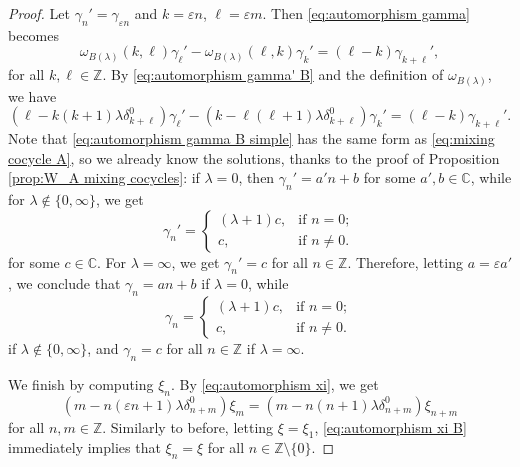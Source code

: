 \documentclass[11pt, svgnames]{amsart}
\newcommand{\ZZ}{\mathbb{Z}}
\newcommand{\CC}{\mathbb{C}}
\newcommand{\nonzero}{\setminus \{0\}}
\theoremstyle{definition}
\begin{document}
\begin{proof}
    Let $\gamma_n' = \gamma_{\varepsilon n}$ and $k = \varepsilon n$, $\ell = \varepsilon m$. Then \eqref{eq:automorphism gamma} becomes
    \begin{equation}\label{eq:automorphism gamma' B}
        \omega_{B(\lambda)}(k,\ell)\gamma_\ell' - \omega_{B(\lambda)}(\ell,k)\gamma_k' = (\ell - k)\gamma_{k+\ell}',
    \end{equation}
    for all $k,\ell \in \ZZ$. By \eqref{eq:automorphism gamma' B} and the definition of $\omega_{B(\lambda)}$, we have
    \begin{equation}\label{eq:automorphism gamma B simple}
        (\ell - k(k + 1)\lambda \delta_{k+\ell}^0)\gamma_\ell' - (k - \ell(\ell + 1)\lambda \delta_{k+\ell}^0)\gamma_k' = (\ell - k)\gamma_{k+\ell}'.
    \end{equation}
    Note that \eqref{eq:automorphism gamma B simple} has the same form as \eqref{eq:mixing cocycle A}, so we already know the solutions, thanks to the proof of Proposition \ref{prop:W_A mixing cocycles}: if $\lambda = 0$, then $\gamma_n' = a'n + b$ for some $a',b \in \CC$, while for $\lambda \notin \{0,\infty\}$, we get
    $$\gamma_n' = \begin{cases}
        (\lambda + 1)c, &\text{if } n = 0; \\
        c, &\text{if } n \neq 0.
    \end{cases}$$
    for some $c \in \CC$. For $\lambda = \infty$, we get $\gamma_n' = c$ for all $n \in \ZZ$. Therefore, letting $a = \varepsilon a'$, we conclude that $\gamma_n = an + b$ if $\lambda = 0$, while
    $$\gamma_n = \begin{cases}
        (\lambda + 1)c, &\text{if } n = 0; \\
        c, &\text{if } n \neq 0.
    \end{cases}$$
    if $\lambda \notin \{0,\infty\}$, and $\gamma_n = c$ for all $n \in \ZZ$ if $\lambda = \infty$.

    We finish by computing $\xi_n$. By \eqref{eq:automorphism xi}, we get
    \begin{equation}\label{eq:automorphism xi B}
        (m - n(\varepsilon n + 1)\lambda \delta_{n+m}^0)\xi_m = (m - n(n + 1)\lambda \delta_{n+m}^0)\xi_{n+m}
    \end{equation}
    for all $n,m \in \ZZ$. Similarly to before, letting $\xi = \xi_1$, \eqref{eq:automorphism xi B} immediately implies that $\xi_n = \xi$ for all $n \in \ZZ \nonzero$.
    

\end{proof}
\end{document}
